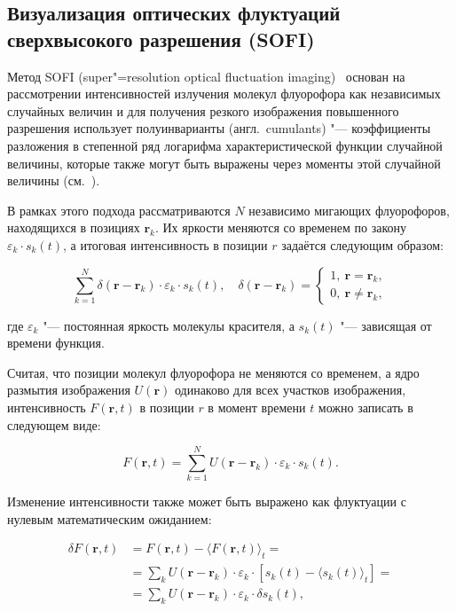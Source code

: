 \subsection{Визуализация оптических флуктуаций сверхвысокого разрешения (SOFI)}

Метод SOFI (super"=resolution optical fluctuation imaging)~\cite{dertinger2009fast,dertinger2010achieving} основан на рассмотрении интенсивностей излучения молекул флуорофора как независимых случайных величин и для получения резкого изображения повышенного разрешения использует полуинварианты (англ.~cumulants) "--- коэффициенты разложения в степенной ряд логарифма характеристической функции случайной величины, которые также могут быть выражены через моменты этой случайной величины (см.~\cite{75086, малахов1978кумулянтный}).

В рамках этого подхода рассматриваются $N$ независимо мигающих флуорофоров, находящихся в позициях $\mathbf{r}_k$. Их яркости меняются со временем по закону $\varepsilon_k\cdot s_k(t)$, а итоговая интенсивность в позиции $r$ задаётся следующим образом:

\begin{equation}
	\sum_{k=1}^{N}{\delta(\mathbf{r}-\mathbf{r}_k)\cdot\varepsilon_k\cdot s_k(t)}, \quad \delta\left(\mathbf{r}-\mathbf{r}_k\right)=
	\begin{cases}
		1,\ \mathbf{r}=\mathbf{r}_k, \\
		0,\ \mathbf{r}\neq\mathbf{r}_k,
	\end{cases} \nonumber
\end{equation}	

\noindent где $\varepsilon_k$ "--- постоянная яркость молекулы красителя, а $s_k(t)$ "--- зависящая от времени функция.

Считая, что позиции молекул флуорофора не меняются со временем, а ядро размытия изображения $U(\mathbf{r})$ одинаково для всех участков изображения, интенсивность $F(\mathbf{r},t)$ в позиции $r$ в момент времени $t$ можно записать в следующем виде:

\begin{equation}
	F\left(\mathbf{r},t\right)=\sum_{k=1}^{N}{U(\mathbf{r}-\mathbf{r}_k)\cdot\varepsilon_k\cdot s_k(t)}. \nonumber
\end{equation}

Изменение интенсивности также может быть выражено как флуктуации с нулевым математическим ожиданием:

\begin{align*}
	\delta F\left(\mathbf{r},t\right) &= F\left(\mathbf{r},t\right)-\langle F\left(\mathbf{r},t\right) \rangle_t = \\
	&= \sum_{k} {U\left(\mathbf{r} - \mathbf{r}_k\right) \cdot \varepsilon_k \cdot \left[ s_k\left(t\right)- \langle s_k\left(t\right) \rangle_t \right]} = \\
	&= \sum_{k} {U\left(\mathbf{r} - \mathbf{r}_k\right) \cdot \varepsilon_k \cdot \delta s_k \left(t\right)},
\end{align*}

